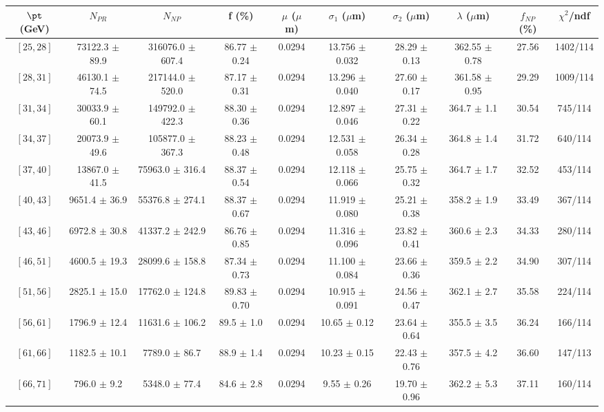 \begin{tabular}{c||c|c|c|c|c|c|c||c|c}
$\pt$ (GeV) & $N_{PR}$ & $N_{NP}$ & f (\%) & $\mu$ ($\mu$m) & $\sigma_1$ ($\mu$m) & $\sigma_2$ ($\mu$m)  & $\lambda$ ($\mu$m) & $f_{NP}$ (\%) & $\chi^2$/ndf \\
\hline
$[25, 28]$ & 73122.3 $\pm$ 89.9 & 316076.0 $\pm$ 607.4 & 86.77 $\pm$ 0.24 & 0.0294 & 13.756 $\pm$ 0.032 & 28.29 $\pm$ 0.13 & 362.55 $\pm$ 0.78 & 27.56 & 1402/114\\
$[28, 31]$ & 46130.1 $\pm$ 74.5 & 217144.0 $\pm$ 520.0 & 87.17 $\pm$ 0.31 & 0.0294 & 13.296 $\pm$ 0.040 & 27.60 $\pm$ 0.17 & 361.58 $\pm$ 0.95 & 29.29 & 1009/114\\
$[31, 34]$ & 30033.9 $\pm$ 60.1 & 149792.0 $\pm$ 422.3 & 88.30 $\pm$ 0.36 & 0.0294 & 12.897 $\pm$ 0.046 & 27.31 $\pm$ 0.22 & 364.7 $\pm$ 1.1 & 30.54 & 745/114\\
$[34, 37]$ & 20073.9 $\pm$ 49.6 & 105877.0 $\pm$ 367.3 & 88.23 $\pm$ 0.48 & 0.0294 & 12.531 $\pm$ 0.058 & 26.34 $\pm$ 0.28 & 364.8 $\pm$ 1.4 & 31.72 & 640/114\\
$[37, 40]$ & 13867.0 $\pm$ 41.5 & 75963.0 $\pm$ 316.4 & 88.37 $\pm$ 0.54 & 0.0294 & 12.118 $\pm$ 0.066 & 25.75 $\pm$ 0.32 & 364.7 $\pm$ 1.7 & 32.52 & 453/114\\
$[40, 43]$ & 9651.4 $\pm$ 36.9 & 55376.8 $\pm$ 274.1 & 88.37 $\pm$ 0.67 & 0.0294 & 11.919 $\pm$ 0.080 & 25.21 $\pm$ 0.38 & 358.2 $\pm$ 1.9 & 33.49 & 367/114\\
$[43, 46]$ & 6972.8 $\pm$ 30.8 & 41337.2 $\pm$ 242.9 & 86.76 $\pm$ 0.85 & 0.0294 & 11.316 $\pm$ 0.096 & 23.82 $\pm$ 0.41 & 360.6 $\pm$ 2.3 & 34.33 & 280/114\\
$[46, 51]$ & 4600.5 $\pm$ 19.3 & 28099.6 $\pm$ 158.8 & 87.34 $\pm$ 0.73 & 0.0294 & 11.100 $\pm$ 0.084 & 23.66 $\pm$ 0.36 & 359.5 $\pm$ 2.2 & 34.90 & 307/114\\
$[51, 56]$ & 2825.1 $\pm$ 15.0 & 17762.0 $\pm$ 124.8 & 89.83 $\pm$ 0.70 & 0.0294 & 10.915 $\pm$ 0.091 & 24.56 $\pm$ 0.47 & 362.1 $\pm$ 2.7 & 35.58 & 224/114\\
$[56, 61]$ & 1796.9 $\pm$ 12.4 & 11631.6 $\pm$ 106.2 & 89.5 $\pm$ 1.0 & 0.0294 & 10.65 $\pm$ 0.12 & 23.64 $\pm$ 0.64 & 355.5 $\pm$ 3.5 & 36.24 & 166/114\\
$[61, 66]$ & 1182.5 $\pm$ 10.1 & 7789.0 $\pm$ 86.7 & 88.9 $\pm$ 1.4 & 0.0294 & 10.23 $\pm$ 0.15 & 22.43 $\pm$ 0.76 & 357.5 $\pm$ 4.2 & 36.60 & 147/113\\
$[66, 71]$ & 796.0 $\pm$ 9.2 & 5348.0 $\pm$ 77.4 & 84.6 $\pm$ 2.8 & 0.0294 & 9.55 $\pm$ 0.26 & 19.70 $\pm$ 0.96 & 362.2 $\pm$ 5.3 & 37.11 & 160/114\\

\end{tabular}
